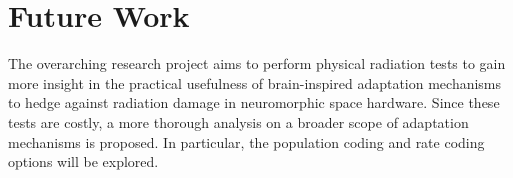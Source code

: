 \section{Future Work}\label{sec:recommendations}
The overarching research project aims to perform physical radiation tests to gain more insight in the practical usefulness of brain-inspired adaptation mechanisms to hedge against radiation damage in neuromorphic space hardware. Since these tests are costly, a more thorough analysis on a broader scope of adaptation mechanisms is proposed. In particular, the population coding and rate coding options will be explored.%